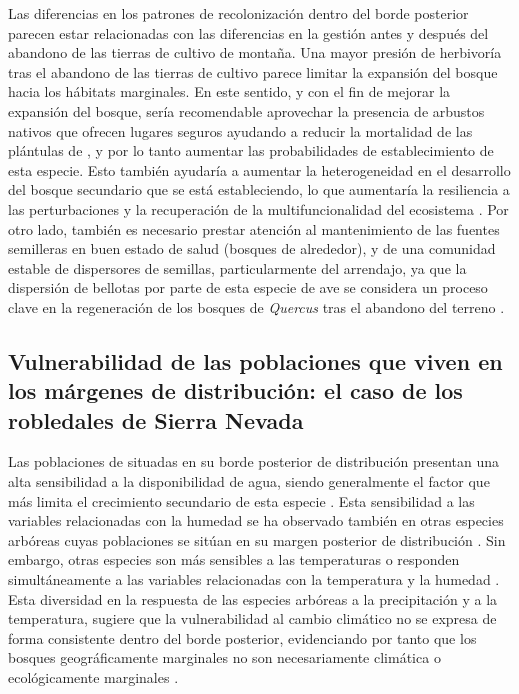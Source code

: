 Las diferencias en los patrones de recolonización dentro del borde posterior parecen estar relacionadas con las diferencias en la gestión antes y después del abandono de las tierras de cultivo de montaña. Una mayor presión de herbivoría tras el abandono de las tierras de cultivo parece limitar la expansión del bosque hacia los hábitats marginales. En este sentido, y con el fin de mejorar la expansión del bosque, sería recomendable aprovechar la presencia de arbustos nativos que ofrecen lugares seguros ayudando a reducir la mortalidad de las plántulas de \Qp, y por lo tanto aumentar las probabilidades de establecimiento de esta especie. Esto también ayudaría a aumentar la heterogeneidad en el desarrollo del bosque secundario que se está estableciendo, lo que aumentaría la resiliencia a las perturbaciones y la recuperación de la multifuncionalidad del ecosistema \autocite{Stritihetal2021ImpactLanduse, CruzAlonsoetal2019LongTerm}. Por otro lado, también es necesario prestar atención al mantenimiento de las fuentes semilleras en buen estado de salud (bosques de alrededor), y de una comunidad estable de dispersores de semillas, particularmente del arrendajo, ya que la dispersión de bellotas por parte de esta especie de ave se considera un proceso clave en la regeneración de los bosques de \emph{Quercus} tras el abandono del terreno \autocite{Pausasetal2006RegenerationMarginal}.


\subsection*{Vulnerabilidad de las poblaciones que viven en los márgenes de distribución: el caso de los robledales de Sierra Nevada
}\label{sec:discussions:rear}

Las poblaciones de \Qp situadas en su borde posterior de distribución presentan una alta sensibilidad a la disponibilidad de agua, siendo generalmente el factor que más limita el crecimiento secundario de esta especie \autocite[\emph{e.g.} capítulo \ref{sec:dendro}, ][]{GeaIzquierdoCanellas2014LocalClimate}. Esta sensibilidad a las variables relacionadas con la humedad se ha observado también en otras especies arbóreas cuyas poblaciones se sitúan en su margen posterior de distribución \autocite[\emph{e.g. Abies alba}][]{MartinezSanchoGutierrezMerino2019EvidenceThat}. Sin embargo, otras especies son más sensibles a las temperaturas \autocite[\emph{e.g.} \emph{Pinus sylvestris},][]{Herreroetal2013VaryingClimate} o responden simultáneamente a las variables relacionadas con la temperatura y la humedad \autocites[\emph{e.g.} \emph{Fagus sylvatica},][]{DoradoLinanetal2017CoexistenceMediterraneanTemperate,DoradoLinanetal2017ClimateThreats}[\emph{Pinus nigra} subsp. \emph{salzmanii},][]{SanchezSalgueroetal2012DroughtMain}. Esta diversidad en la respuesta de las especies arbóreas a la precipitación y a la temperatura, sugiere que la vulnerabilidad al cambio climático no se expresa de forma consistente dentro del borde posterior, evidenciando por tanto que los bosques geográficamente marginales no son necesariamente climática o ecológicamente marginales \autocite[ver][ y las referencias en dicho trabajo]{DoradoLinanetal2019GeographicalAdaptation}.

